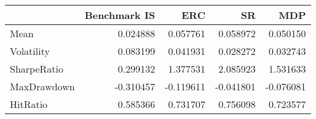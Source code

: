 \begin{tabular}{lrrrr}
\toprule
{} &  Benchmark IS &       ERC &        SR &       MDP \\
\midrule
Mean        &      0.024888 &  0.057761 &  0.058972 &  0.050150 \\
Volatility  &      0.083199 &  0.041931 &  0.028272 &  0.032743 \\
SharpeRatio &      0.299132 &  1.377531 &  2.085923 &  1.531633 \\
MaxDrawdown &     -0.310457 & -0.119611 & -0.041801 & -0.076081 \\
HitRatio    &      0.585366 &  0.731707 &  0.756098 &  0.723577 \\
\bottomrule
\end{tabular}
